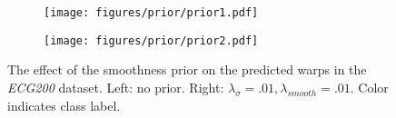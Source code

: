 \begin{figure}[t]
    \centering
    \def\figwidth{0.48\linewidth } %
    \begin{subfigure}{\figwidth}
     \centering
    {\texttt{[image: figures/prior/prior1.pdf]}\label{fig:prior:a}}
    \end{subfigure}
    \begin{subfigure}{\figwidth}
     \centering
    {\texttt{[image: figures/prior/prior2.pdf]}\label{fig:prior:b}}
    \end{subfigure}
    
    \caption{
    The effect of the smoothness prior on the predicted warps in the \textit{ECG200} dataset. Left: no prior. Right: 
    $\lambda_{\sigma}=.01, \lambda_{smooth}=.01$. 
    Color indicates class label. }
    
    \label{fig:prior}
    \end{figure}
